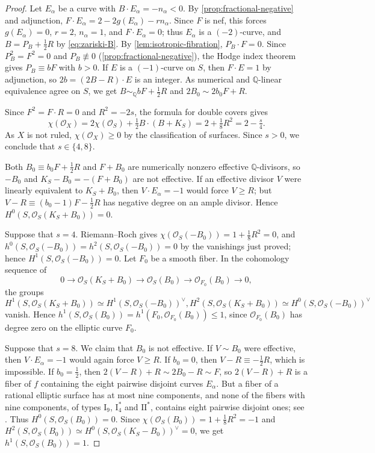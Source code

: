 \documentclass[11pt,reqno]{amsart}
\numberwithin{equation}{section}
\theoremstyle{remark}
\newcommand{\sshf}[1]{\mathcal{O}_{#1}}
\begin{document}
\begin{proof}
Let \(E_\alpha\) be a curve with \(B\cdot E_\alpha=-n_\alpha<0\). By \cref{prop:fractional-negative} and adjunction, \(F\cdot E_\alpha=2-2g(E_\alpha)-rn_\alpha\). Since \(F\) is nef, this forces \(g(E_\alpha)=0\), \(r=2\), \(n_\alpha=1\), and \(F\cdot E_\alpha=0\); thus \(E_\alpha\) is a \((-2)\)-curve, and \(B=P_B+\tfrac12R\) by \eqref{eq:zariski-B}. By \cref{lem:isotropic-fibration}, \(P_B\cdot F=0\). Since \(P_B^2=F^2=0\) and \(P_B\not\equiv0\) (\cref{prop:fractional-negative}), the Hodge index theorem gives \(P_B\equiv bF\) with \(b>0\). If \(E\) is a \((-1)\)-curve on \(S\), then \(F\cdot E=1\) by adjunction, so \(2b=(2B-R)\cdot E\) is an integer. As numerical and \(\mathbb Q\)-linear equivalence agree on \(S\), we get \(B\sim_{\mathbb Q}bF+\tfrac12R\) and \(2B_0\sim2b_0F+R\).

Since \(F^2=F\cdot R=0\) and \(R^2=-2s\), the formula for double covers gives
\[
 \chi(\sshf{X})=2\chi(\sshf{S})+\tfrac12B\cdot(B+K_S)=2+\tfrac18R^2=2-\tfrac{s}{4}.
\]
As \(X\) is not ruled, \(\chi(\sshf{X})\geq0\) by the classification of surfaces. Since \(s>0\), we conclude that \(s\in\{4,8\}\).

Both \(B_0\equiv b_0F+\tfrac12R\) and \(F+B_0\) are numerically nonzero effective \(\mathbb Q\)-divisors, so \(-B_0\) and \(K_S-B_0=-(F+B_0)\) are not effective. If an effective divisor \(V\) were linearly equivalent to \(K_S+B_0\), then \(V\cdot E_\alpha=-1\) would force \(V\geq R\); but \(V-R\equiv(b_0-1)F-\tfrac12R\) has negative degree on an ample divisor. Hence \(H^0(S,\sshf{S}(K_S+B_0))=0\).

Suppose that \(s=4\). Riemann--Roch gives \(\chi(\sshf{S}(-B_0))=1+\tfrac18R^2=0\), and \(h^0(S,\sshf{S}(-B_0))=h^2(S,\sshf{S}(-B_0))=0\) by the vanishings just proved; hence \(H^1(S,\sshf{S}(-B_0))=0\). Let \(F_0\) be a smooth fiber. In the cohomology sequence of
\[
 0\longrightarrow\sshf{S}(K_S+B_0)\longrightarrow\sshf{S}(B_0)\longrightarrow\sshf{F_0}(B_0)\longrightarrow0,
\]
the groups 
\[H^1(S,\sshf{S}(K_S+B_0))\simeq H^1(S,\sshf{S}(-B_0))^\vee,  H^2(S,\sshf{S}(K_S+B_0))\simeq H^0(S,\sshf{S}(-B_0))^\vee\] vanish. Hence \(h^1(S,\sshf{S}(B_0))=h^1(F_0,\sshf{F_0}(B_0))\leq1\), since \(\sshf{F_0}(B_0)\) has degree zero on the elliptic curve \(F_0\).

Suppose that \(s=8\). We claim that \(B_0\) is not effective. If \(V\sim B_0\) were effective, then \(V\cdot E_\alpha=-1\) would again force \(V\geq R\). If \(b_0=0\), then \(V-R\equiv-\tfrac12R\), which is impossible. If \(b_0=\tfrac12\), then \(2(V-R)+R\sim2B_0-R\sim F\), so \(2(V-R)+R\) is a fiber of \(f\) containing the eight pairwise disjoint curves \(E_\alpha\). But a fiber of a rational elliptic surface has at most nine components, and none of the fibers with nine components, of types \(\mathrm I_9\), \(\mathrm I_4^*\) and \(\mathrm{II}^*\), contains eight pairwise disjoint ones; see \cite[Table~(1.1)]{Miranda}. Thus \(H^0(S,\sshf{S}(B_0))=0\). Since \(\chi(\sshf{S}(B_0))=1+\tfrac18R^2=-1\) and \(H^2(S,\sshf{S}(B_0))\simeq H^0(S,\sshf{S}(K_S-B_0))^\vee=0\), we get \(h^1(S,\sshf{S}(B_0))=1\).
\end{proof}
\end{document}
